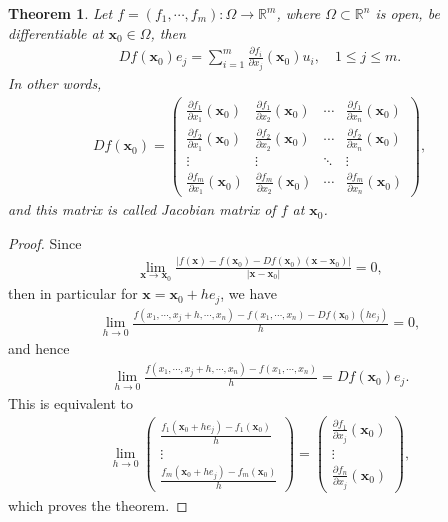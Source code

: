 \documentclass[11pt]{book}
\newtheorem{theorem}{Theorem}[chapter]
\theoremstyle{definition}
\numberwithin{equation}{chapter}
\begin{document}
\begin{theorem}\label{th_75}
Let $f = (f_1, \cdots, f_m): \Omega \to \mathbb{R}^m$, where $\Omega \subset \mathbb{R}^n$ is open, be differentiable at $\mathbf{x}_0 \in \Omega$, then
\begin{align}\label{th_75_equ1}
    Df(\mathbf{x}_0)e_j = \sum^m_{i=1} \frac{\partial f_i}{\partial x_j}(\mathbf{x}_0) u_i, \quad 1 \leq j \leq m.
\end{align}
In other words,
\begin{align*}
    Df(\mathbf{x}_0) = \begin{pmatrix}
        \frac{\partial f_1}{\partial x_1}(\mathbf{x}_0) & \frac{\partial f_1}{\partial x_2}(\mathbf{x}_0) & \cdots & \frac{\partial f_1}{\partial x_n}(\mathbf{x}_0) \\
        \frac{\partial f_2}{\partial x_1}(\mathbf{x}_0) & \frac{\partial f_2}{\partial x_2}(\mathbf{x}_0) & \cdots & \frac{\partial f_2}{\partial x_n}(\mathbf{x}_0) \\
        \vdots & \vdots & \ddots & \vdots \\
        \frac{\partial f_m}{\partial x_1}(\mathbf{x}_0) & \frac{\partial f_m}{\partial x_2}(\mathbf{x}_0) & \cdots & \frac{\partial f_m}{\partial x_n}(\mathbf{x}_0)
    \end{pmatrix},
\end{align*}
and this matrix is called Jacobian matrix of $f$ at $\mathbf{x}_0$.
\end{theorem}
\begin{proof}
Since
\begin{align*}
    \lim_{\mathbf{x} \to \mathbf{x}_0} \frac{\left|f(\mathbf{x}) - f(\mathbf{x}_0) - Df(\mathbf{x}_0) (\mathbf{x} - \mathbf{x}_0)\right|}{\left|\mathbf{x} - \mathbf{x}_0\right|} = 0,
\end{align*}
then in particular for $\mathbf{x} = \mathbf{x}_0 + he_j$, we have
\begin{align*}
    \lim_{h \to 0} \frac{f(x_1,\cdots,x_j+h, \cdots,x_n) - f(x_1,\cdots,x_n) - Df(\mathbf{x}_0)(he_j)}{h} = 0,
\end{align*}
and hence
\begin{align*}
    \lim_{h \to 0} \frac{f(x_1,\cdots,x_j+h, \cdots,x_n) - f(x_1,\cdots,x_n)}{h} = Df(\mathbf{x}_0)e_j.
\end{align*}
This is equivalent to
\begin{align*}
    \lim_{h \to 0} \begin{pmatrix}
        \frac{f_1(\mathbf{x}_0 + he_j) - f_1(\mathbf{x}_0)}{h} \\
        \vdots \\
        \frac{f_m(\mathbf{x}_0 + he_j) - f_m(\mathbf{x}_0)}{h}
    \end{pmatrix} = \begin{pmatrix}
        \frac{\partial f_1}{\partial x_j}(\mathbf{x}_0) \\
        \vdots \\
        \frac{\partial f_n}{\partial x_j}(\mathbf{x}_0)
    \end{pmatrix},
\end{align*}
which proves the theorem.
\end{proof}
\end{document}
